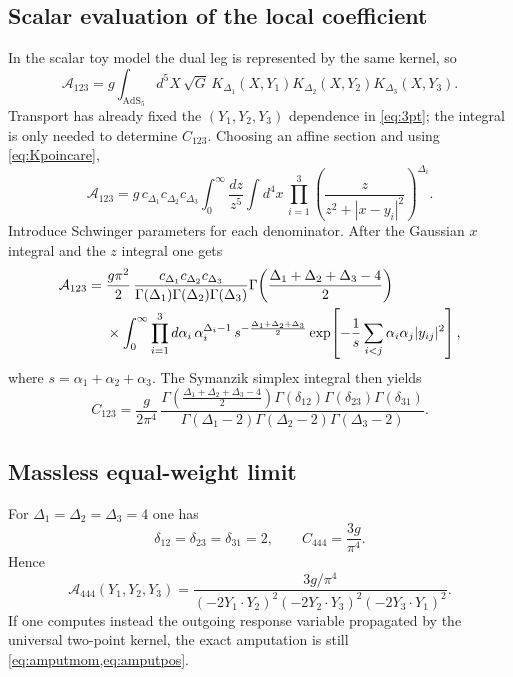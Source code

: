\documentclass[11pt]{article}
\newcommand{\AdS}{\mathrm{AdS}_5}
\newcommand{\Dims}[1]{\Delta_{#1}}
\newcommand{\Ypt}[1]{Y_{#1}}
\begin{document}
\subsection{Scalar evaluation of the local coefficient}

In the scalar toy model the dual leg is represented by the same kernel, so
\begin{equation}
\mathcal{A}_{123}
=
g\int_{\AdS}\! d^5X\,\sqrt{G}\,
K_{\Dims1}(X,\Ypt1)K_{\Dims2}(X,\Ypt2)K_{\Dims3}(X,\Ypt3).
\label{eq:K123def}
\end{equation}
Transport has already fixed the $(Y_1,Y_2,Y_3)$ dependence in \cref{eq:3pt}; the integral is only needed to determine $C_{123}$. Choosing an affine section and using \cref{eq:Kpoincare},
\begin{equation}
\mathcal{A}_{123}
=
g\,c_{\Dims1}c_{\Dims2}c_{\Dims3}
\int_0^\infty\!\frac{dz}{z^5}\int d^4x\,
\prod_{i=1}^3
\left(\frac{z}{z^2+|x-y_i|^2}\right)^{\Dims{i}}.
\label{eq:contactint}
\end{equation}
Introduce Schwinger parameters for each denominator. After the Gaussian $x$ integral and the $z$ integral one gets
\begin{align}
\mathcal{A}_{123}
=\;&
\frac{g\pi^2}{2}\,
\frac{c_{\Dims1}c_{\Dims2}c_{\Dims3}}
{\Gamma(\Dims1)\Gamma(\Dims2)\Gamma(\Dims3)}
\Gamma\!\left(\frac{\Dims1+\Dims2+\Dims3-4}{2}\right)
\notag\\
&\times
\int_0^\infty \prod_{i=1}^3 d\alpha_i\,
\alpha_i^{\Dims{i}-1}\,
s^{-\frac{\Dims1+\Dims2+\Dims3}{2}}
\exp\!\left[
-\frac{1}{s}\sum_{i<j}\alpha_i\alpha_j |y_{ij}|^2
\right],
\label{eq:schwinger}
\end{align}
where $s=\alpha_1+\alpha_2+\alpha_3$. The Symanzik simplex integral then yields
\begin{equation}
C_{123}
=
\frac{g}{2\pi^4}\,
\frac{\Gamma\!\left(\frac{\Dims1+\Dims2+\Dims3-4}{2}\right)
\Gamma(\delta_{12})\Gamma(\delta_{23})\Gamma(\delta_{31})}
{\Gamma(\Dims1-2)\Gamma(\Dims2-2)\Gamma(\Dims3-2)}.
\label{eq:C123}
\end{equation}

\subsection{Massless equal-weight limit}

For $\Dims1=\Dims2=\Dims3=4$ one has
\begin{equation}
\delta_{12}=\delta_{23}=\delta_{31}=2,
\qquad
C_{444}=\frac{3g}{\pi^4}.
\label{eq:C444raw}
\end{equation}
Hence
\begin{equation}
\mathcal{A}_{444}(\Ypt1,\Ypt2,\Ypt3)
=
\frac{3g/\pi^4}
{(-2\Ypt1\!\cdot\!\Ypt2)^2(-2\Ypt2\!\cdot\!\Ypt3)^2(-2\Ypt3\!\cdot\!\Ypt1)^2}.
\label{eq:C444}
\end{equation}
If one computes instead the outgoing response variable propagated by the universal two-point kernel, the exact amputation is still \cref{eq:amputmom,eq:amputpos}.
\end{document}
